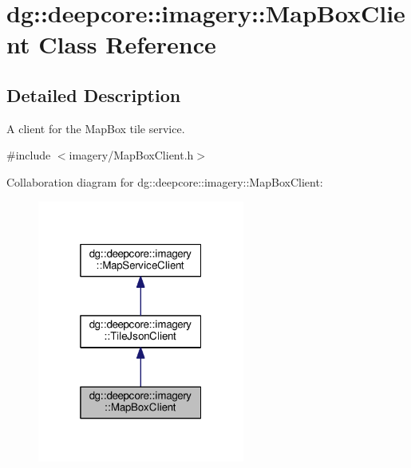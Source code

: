 \hypertarget{classdg_1_1deepcore_1_1imagery_1_1_map_box_client}{}\section{dg\+:\+:deepcore\+:\+:imagery\+:\+:Map\+Box\+Client Class Reference}
\label{classdg_1_1deepcore_1_1imagery_1_1_map_box_client}


\subsection{Detailed Description}
A client for the Map\+Box tile service. 

{\ttfamily \#include $<$imagery/\+Map\+Box\+Client.\+h$>$}



Collaboration diagram for dg\+:\+:deepcore\+:\+:imagery\+:\+:Map\+Box\+Client\+:
\nopagebreak
\begin{figure}[H]
\begin{center}
\leavevmode
\includegraphics[width=193pt]{classdg_1_1deepcore_1_1imagery_1_1_map_box_client__coll__graph}
\end{center}
\end{figure}
